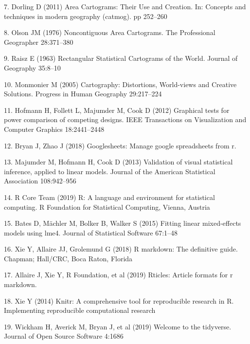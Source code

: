 \documentclass[conference,final,]{IEEEtran}
\begin{document}
\leavevmode\hypertarget{ref-ACTUC}{}%
7. Dorling D (2011) Area Cartograms: Their Use and Creation. In: Concepts and techniques in modern geography (catmog). pp 252--260

\leavevmode\hypertarget{ref-NAC}{}%
8. Olson JM (1976) Noncontiguous Area Cartograms. The Professional Geographer 28:371--380

\leavevmode\hypertarget{ref-RSCW}{}%
9. Raisz E (1963) Rectangular Statistical Cartograms of the World. Journal of Geography 35:8--10

\leavevmode\hypertarget{ref-CDWCS}{}%
10. Monmonier M (2005) Cartography: Distortions, World-views and Creative Solutions. Progress in Human Geography 29:217--224

\leavevmode\hypertarget{ref-GTPCCD}{}%
11. Hofmann H, Follett L, Majumder M, Cook D (2012) Graphical tests for power comparison of competing designs. IEEE Transactions on Visualization and Computer Graphics 18:2441--2448

\leavevmode\hypertarget{ref-sheets}{}%
12. Bryan J, Zhao J (2018) Googlesheets: Manage google spreadsheets from r.

\leavevmode\hypertarget{ref-VVSIALM}{}%
13. Majumder M, Hofmann H, Cook D (2013) Validation of visual statistical inference, applied to linear models. Journal of the American Statistical Association 108:942--956

\leavevmode\hypertarget{ref-RCore}{}%
14. R Core Team (2019) R: A language and environment for statistical computing. R Foundation for Statistical Computing, Vienna, Austria

\leavevmode\hypertarget{ref-lme4}{}%
15. Bates D, Mächler M, Bolker B, Walker S (2015) Fitting linear mixed-effects models using lme4. Journal of Statistical Software 67:1--48

\leavevmode\hypertarget{ref-rmarkdown}{}%
16. Xie Y, Allaire JJ, Grolemund G (2018) R markdown: The definitive guide. Chapman; Hall/CRC, Boca Raton, Florida

\leavevmode\hypertarget{ref-rticles}{}%
17. Allaire J, Xie Y, R Foundation, et al (2019) Rticles: Article formats for r markdown.

\leavevmode\hypertarget{ref-knitr}{}%
18. Xie Y (2014) Knitr: A comprehensive tool for reproducible research in R. Implementing reproducible computational research

\leavevmode\hypertarget{ref-tidyverse}{}%
19. Wickham H, Averick M, Bryan J, et al (2019) Welcome to the tidyverse. Journal of Open Source Software 4:1686
\end{document}
